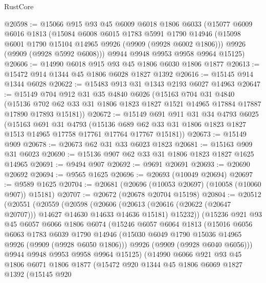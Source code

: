 \begin{lexlean}{RustCore}
\begin{coremodule}
@20598 := @15066
    @915
    @93
    @45
    @6009
    @6018
    @1806
    @6033
    (@15077
      @6009
      @6016
      @1813
      (@15084
        @6008
        @6015
        @1783
        @5991
        @1790
        @14946
        (@15098 @6001 @1790 @15104 @14965 @9926 (@9909 (@9928 @6002 @1806)))
        @9926
        (@9909 (@9928 @5992 @6008)))
      @9944
      @9948
      @9953
      @9958
      @9964
      @15125)
@20606 := @14990 @6018 @915 @93 @45 @1806 @6030 @1806 @1877
@20613 := @15472 @914 @1344 @45 @1806 @6028 @1827 @1392
@20616 := @15145 @914 @1344 @6028
@20622 := @15483 @913 @31 @1343 @2193 @6027 @14963
@20647 := @15149
    @704
    @912
    @31
    @35
    @4840
    @6026
    (@15163
      @704
      @31
      @4840
      (@15136 @702 @62 @33 @31 @1806 @1823 @1827 @1521 @14965 @17884 @17887 @17890 @17893 @15181))
@20672 := @15149
    @691
    @911
    @31
    @34
    @4793
    @6025
    (@15163
      @691
      @31
      @4793
      (@15136 @689 @62 @33 @31 @1806 @1823 @1827 @1513 @14965 @17758 @17761 @17764 @17767 @15181))
@20673 := @15149 @909
@20678 := @20673 @62 @31 @33 @6023 @1823
@20681 := @15163 @909 @31 @6023
@20690 := @15136 @907 @62 @33 @31 @1806 @1823 @1827 @1625 @14965
@20691 := @9494 @907
@20692 := @9691 @20691
@20693 := @20690 @20692
@20694 := @9565 @1625
@20696 := @20693 (@10049 @20694)
@20697 := @9589 @1625
@20704 := @20681 (@20696 (@10053 @20697) (@10058 (@10060 @907)) @15181)
@20707 := @20672 (@20678 @20704 @15198)
@20804 := @20512
    (@20551
      (@20559
        (@20598
          (@20606
            (@20613 (@20616 (@20622 (@20647 @20707))) @14627 @14630 @14633 @14636 @15181)
            @15232))
        (@15236
          @921
          @93
          @45
          @6057
          @6066
          @1806
          @6074
          (@15246
            @6057
            @6064
            @1813
            (@15016
              @6056
              @6063
              @1783
              @6039
              @1790
              @14946
              (@15030 @6049 @1790 @15036 @14965 @9926 (@9909 (@9928 @6050 @1806)))
              @9926
              (@9909 (@9928 @6040 @6056)))
            @9944
            @9948
            @9953
            @9958
            @9964
            @15125)
          (@14990
            @6066
            @921
            @93
            @45
            @1806
            @6071
            @1806
            @1877
            (@15472
              @920
              @1344
              @45
              @1806
              @6069
              @1827
              @1392
              (@15145
                @920

\end{coremodule}
\end{lexlean}
